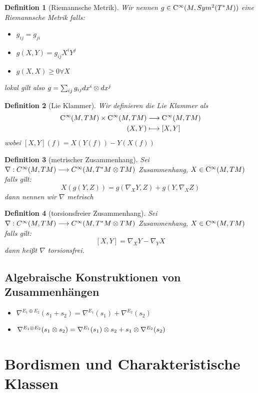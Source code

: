 \documentclass{report}
\newtheorem{Def}{Definition}[chapter]
\begin{document}
\begin{Def}[Riemannsche Metrik]
    Wir nennen $g \in \mathrm{C}^\infty(M,Sym^2(T^*M))$ eine Riemannsche Metrik falls:
    \begin{itemize}
        \item $g_{ij} = g_{ji}$
        \item $g(X,Y) = g_{ij}X^iY^j$
        \item $g(X,X) \geq 0 \forall X$
    \end{itemize}
    lokal gilt also $g = \sum_{ij} g_{ij} dx^i \otimes dx^j$
\end{Def}

\begin{Def}[Lie Klammer]
    Wir definieren die Lie Klammer als
    \begin{align*}
        \mathrm{C}^\infty(M,TM) \times \mathrm{C}^\infty(M,TM)& \longrightarrow \mathrm{C}^\infty(M,TM) \\
        (X,Y)& \longmapsto [X,Y] 
    \end{align*}
    wobei $[X,Y](f) = X(Y(f)) - Y(X(f))$ 
\end{Def}

\begin{Def}[metrischer Zusammenhang]
    Sei\\
    $\nabla: C^\infty(M , TM) \longrightarrow C^\infty( M ,T^*M \otimes TM )$ Zusammenhang, $X \in \mathrm{C}^\infty(M,TM)$ falls gilt:
    $$X(g(Y,Z)) = g(\nabla_XY,Z) + g(Y,\nabla_XZ)$$
    dann nennen wir $\nabla$ metrisch
    
\end{Def}

\begin{Def}[torsionsfreier Zusammenhang]
    Sei\\
    $\nabla: C^\infty(M , TM) \longrightarrow C^\infty( M ,T^*M \otimes TM )$ Zusammenhang, $X \in \mathrm{C}^\infty(M,TM)$ falls gilt:
    $$[X,Y] =  \nabla_XY - \nabla_YX$$
    dann heißt $\nabla$ torsionsfrei. 
\end{Def}

\subsection*{Algebraische Konstruktionen von Zusammenhängen}
\begin{itemize}
    \item $\nabla^{E_1 \oplus E_2}(s_1 + s_2) = \nabla^{E_1}(s_1) + \nabla^{E_2}(s_2)$
    \item $\nabla^{E_1 \otimes E_2}(s_1 \otimes s_2) = \nabla^{E_1}(s_1) \otimes s_2 + s_1 \otimes \nabla^{E_2}(s_2)$
\end{itemize}


\section{Bordismen und Charakteristische Klassen}
\end{document}
